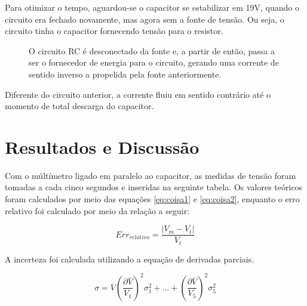 \documentclass[12pt,a4paper]{article}
\begin{document}
\begin{multicols*}{2}
    Para otimizar o tempo, aguardou-se o capacitor se estabilizar em 19V, quando o circuito era fechado novamente, mas agora sem a fonte de tensão. Ou seja, o circuito tinha o capacitor fornecendo tensão para o resistor.
    \begin{figure}[H]
        \centering
        \caption{O circuito RC é desconectado da fonte e, a partir de então, passa a ser o fornecedor de energia para o circuito, gerando uma corrente de sentido inverso a propelida pela fonte anteriormente.}
        \label{circuitoDescarga}
    \end{figure}
    
    Diferente do circuito anterior, a corrente fluiu em sentido contrário até o momento de total descarga do capacitor.


\section{Resultados e Discussão}
    
    Com o múltímetro ligado em paralelo ao capacitor, as medidas de tensão foram tomadas a cada cinco segundos e inseridas na seguinte tabela. Os valores teóricos foram calculados por meio das equações \eqref{eq:coisa1} e \eqref{eq:coisa2}, enquanto o erro relativo foi calculado por meio da relação a seguir:

    \begin{equation}
        Err_{relativo} = \frac{|V_m-V_t|}{V_t}
        \label{eq:coisa1}
    \end{equation}

    A incerteza foi calculada utilizando a equação de derivadas parciais.

    \begin{equation}
        \sigma = \overline V \left(\frac{\partial \overline V}{V_1}\right)^2\sigma_1^2+...+\left(\frac{\partial \overline V}{V_5}\right)^2\sigma_5^2
        \label{eq:coisa2}
    \end{equation}


\end{multicols*}
\end{document}
